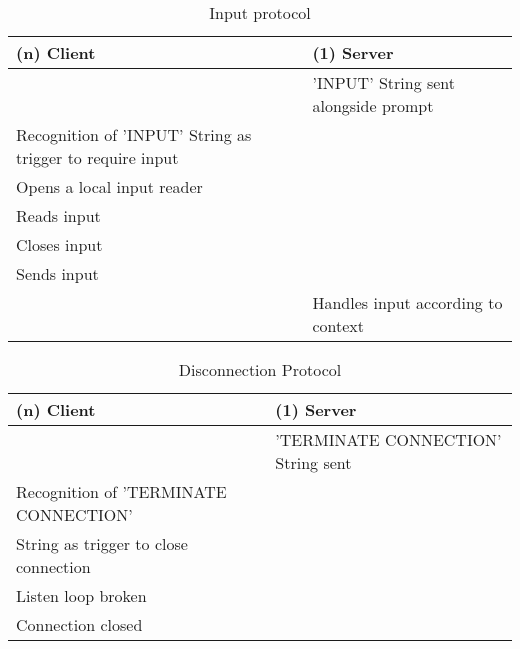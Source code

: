 \begin{table}[H]
	\centering
	\begin{tabular}{ | l | l | }
		\hline
		(n) Client & (1) Server  \\
		\hline
		\hline
		&  'INPUT' String sent alongside prompt  \\
		\hline
		Recognition of 'INPUT' String as trigger to require input & \\
		\hline
		Opens a local input reader &  \\
		\hline
		Reads input &  \\
		\hline
		Closes input & \\
		\hline
		Sends input & \\
		\hline
		 &  Handles input  according to context \\
		\hline
	\end{tabular}
	\caption{Input protocol}
	\label{tab:inputProtocol}
\end{table}

\begin{table}[H]
	\centering
	\begin{tabular}{ | l | l | }
				\hline
				(n) Client & (1) Server  \\
				\hline
				\hline
				&  'TERMINATE CONNECTION' String sent \\
				\hline
				Recognition of 'TERMINATE CONNECTION' & \\ 
				String as trigger to close connection & \\
				\hline 
				Listen loop broken & \\
				\hline
				Connection closed & \\
				\hline
	\end{tabular}
	\caption{Disconnection Protocol}
	\label{tab:disconnectionProtocol}
\end{table}

